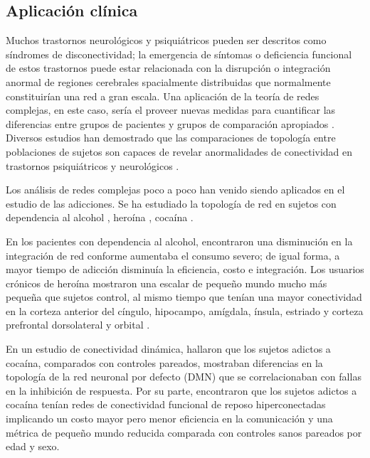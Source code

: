 \subsection{Aplicación clínica}
Muchos trastornos neurológicos y psiquiátricos pueden ser descritos como síndromes de disconectividad; la emergencia de síntomas o deficiencia funcional de estos trastornos puede estar relacionada con la disrupción o integración anormal de regiones cerebrales spacialmente distribuidas que normalmente constituirían una red a gran escala. Una aplicación de la teoría de redes complejas, en este caso, sería el proveer nuevas medidas para cuantificar las diferencias entre grupos de pacientes y grupos de comparación apropiados \parencite{Bullmore2009a}. Diversos estudios han demostrado que las comparaciones de topología entre poblaciones de sujetos son capaces de revelar anormalidades de conectividad en trastornos psiquiátricos y neurológicos \parencite{Bassett2009}. \par
Los análisis de redes complejas poco a poco han venido siendo aplicados en el estudio de las adicciones. Se ha estudiado la topología de red en sujetos con dependencia al alcohol \parencite{Sjoerds2017}, heroína \parencite{Liu2009}, cocaína \parencite{Zhang2018, Wang2015a}. \par
En los pacientes con dependencia al alcohol, \textcite{Sjoerds2017} encontraron una disminución en la integración de red conforme aumentaba el consumo severo; de igual forma, a mayor tiempo de adicción disminuía la eficiencia, costo e integración. Los usuarios crónicos de heroína mostraron una escalar de pequeño mundo mucho más pequeña que sujetos control, al mismo tiempo que tenían una mayor conectividad en la corteza anterior del cíngulo, hipocampo, amígdala, ínsula, estriado y corteza prefrontal dorsolateral y orbital \parencite{Liu2009}. \par
En un estudio de conectividad dinámica, \textcite{Zhang2018} hallaron que los sujetos adictos a cocaína, comparados con controles pareados, mostraban diferencias en la topología de la red neuronal por defecto (DMN) que se correlacionaban con fallas en la inhibición de respuesta.
Por su parte, \textcite{Wang2015a} encontraron que los sujetos adictos a cocaína tenían redes de conectividad funcional de reposo hiperconectadas \textemdash{}implicando un costo mayor\textemdash{} pero menor eficiencia en la comunicación y una métrica de pequeño mundo reducida comparada con controles sanos pareados por edad y sexo.
